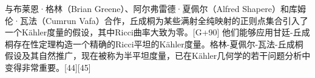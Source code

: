 与布莱恩·格林（Brian Greene）、阿尔弗雷德·夏佩尔（Alfred Shapere）和库姆伦·瓦法（Cumrun Vafa）合作，丘成桐为某些满射全纯映射的正则点集合引入了一个Kähler度量的假设，其中Ricci曲率大致为零。[G+90] 他们能够应用甘廷-丘成桐存在性定理构造一个精确的Ricci平坦的Kähler度量。格林-夏佩尔-瓦法-丘成桐假设及其自然推广，现在被称为半平坦度量，已在Kähler几何学的若干问题分析中变得非常重要。[44][45]


